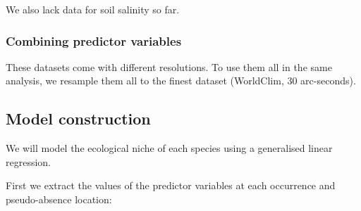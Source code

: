 \documentclass[]{article}
\newenvironment{Shaded}{\begin{snugshade}}{\end{snugshade}}
\newcommand{\AlertTok}[1]{\textcolor[rgb]{0.94,0.16,0.16}{#1}}
\newcommand{\CommentTok}[1]{\textcolor[rgb]{0.56,0.35,0.01}{\textit{#1}}}
\newcommand{\DataTypeTok}[1]{\textcolor[rgb]{0.13,0.29,0.53}{#1}}
\newcommand{\KeywordTok}[1]{\textcolor[rgb]{0.13,0.29,0.53}{\textbf{#1}}}
\newcommand{\NormalTok}[1]{#1}
\newcommand{\OperatorTok}[1]{\textcolor[rgb]{0.81,0.36,0.00}{\textbf{#1}}}
\newcommand{\StringTok}[1]{\textcolor[rgb]{0.31,0.60,0.02}{#1}}
\begin{document}
We also lack data for soil salinity so far.

\hypertarget{combining-predictor-variables}{%
\subsubsection{Combining predictor
variables}\label{combining-predictor-variables}}

These datasets come with different resolutions. To use them all in the
same analysis, we resample them all to the finest dataset (WorldClim, 30
arc-seconds).

\begin{Shaded}
\end{Shaded}

\hypertarget{model-construction}{%
\subsection{Model construction}\label{model-construction}}

We will model the ecological niche of each species using a generalised
linear regression.

First we extract the values of the predictor variables at each
occurrence and pseudo-absence location:

\begin{Shaded}
\end{Shaded}
\end{document}
